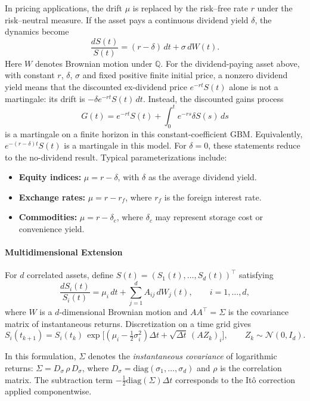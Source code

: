 In pricing applications, the drift \(\mu\) is replaced by the risk--free rate \(r\) under the risk--neutral measure.
If the asset pays a continuous dividend yield \(\delta\), the dynamics become
\[
\frac{dS(t)}{S(t)} = (r - \delta)\,dt + \sigma\,dW(t).
\]
Here $W$ denotes Brownian motion under $\mathbb Q$. For the
dividend-paying asset above, with constant $r$, $\delta$, $\sigma$
and fixed positive finite initial price, a nonzero
dividend yield means that the discounted ex-dividend price $e^{-rt}S(t)$ alone is
not a martingale: its drift is $-\delta e^{-rt}S(t)\,dt$. Instead, the
discounted gains process
\[
G(t)=e^{-rt}S(t)+\int_0^t e^{-rs}\delta S(s)\,ds
\]
is a martingale on a finite horizon in this constant-coefficient GBM.
Equivalently, $e^{-(r-\delta)t}S(t)$ is a martingale in this model. For
$\delta=0$, these statements reduce to the no-dividend result.
Typical parameterizations include:
\begin{itemize}[leftmargin=10mm]
  \item \textbf{Equity indices:} \(\mu = r - \delta\), with \(\delta\) as the average dividend yield.
  \item \textbf{Exchange rates:} \(\mu = r - r_f\), where \(r_f\) is the foreign interest rate.
  \item \textbf{Commodities:} \(\mu = r - \delta_c\), where \(\delta_c\) may represent storage cost or convenience yield.
\end{itemize}

\paragraph{Multidimensional Extension}

For \(d\) correlated assets, define \(S(t)=(S_1(t),\dots,S_d(t))^\top\) satisfying
\[
\frac{dS_i(t)}{S_i(t)} = \mu_i\,dt + \sum_{j=1}^{d}A_{ij}\,dW_j(t),
\qquad i=1,\dots,d,
\]
where \(W\) is a \(d\)-dimensional Brownian motion and \(AA^\top=\Sigma\) is the covariance matrix of instantaneous returns.
Discretization on a time grid gives
\[
S_i(t_{k+1}) = S_i(t_k)\,
\exp\!\Big[(\mu_i - \tfrac{1}{2}\sigma_i^2)\Delta t + \sqrt{\Delta t}\,(A Z_k)_i\Big],
\qquad Z_k\sim\mathcal N(0,I_d).
\]




\begin{remark}
In this formulation, \(\Sigma\) denotes the \emph{instantaneous covariance} of logarithmic returns:
\(\Sigma = D_\sigma\,\rho\,D_\sigma\), where \(D_\sigma = \mathrm{diag}(\sigma_1,\dots,\sigma_d)\) and \(\rho\) is the correlation matrix.
The subtraction term \(-\tfrac{1}{2}\mathrm{diag}(\Sigma)\Delta t\) corresponds to the Itô correction applied componentwise.
\end{remark}


